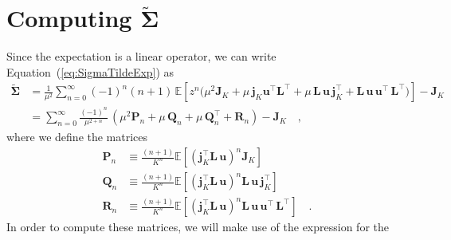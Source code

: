 \documentclass[modern]{aastex62}
\begin{document}
    \section{Computing $\tilde{\pmb{\Sigma}}$}
    Since the expectation is a linear operator, we can write Equation~(\ref{eq:SigmaTildeExp})
    as
    \begin{align}
        \tilde{\pmb{\Sigma}}
         & =
        \frac{1}{\mu^2}
        \sum\limits_{n=0}^\infty
        (-1)^n (n + 1)
        \,
        \mathbb{E}\left[
            z^n
            \Bigg(
            \mu^2 \mathbf{J}_K
            +
            \mu \, \mathbf{j}_K\mathbf{u}^\top \mathbf{L}^\top
            +
            \mu \, \mathbf{L} \, \mathbf{u} \, \mathbf{j}_K^\top
            +
            \mathbf{L} \, \mathbf{u} \, \mathbf{u}^\top \, \mathbf{L}^\top
            \Bigg)
            \right]
        - \mathbf{J}_K
        \nonumber \\[0.5em]
         & =
        \sum\limits_{n=0}^\infty
        \frac{(-1)^n}{\mu^{2 + n}}
        \,
        \left(
        \mu^2 \mathbf{P}_n
        +
        \mu \, \mathbf{Q}_n
        +
        \mu \, \mathbf{Q}_n^\top
        +
        \mathbf{R}_n
        \right)
        - \mathbf{J}_K
        \quad,
    \end{align}
    where we define the matrices
    \begin{align}
        \mathbf{P}_n & \equiv \frac{(n + 1)}{K^n}\mathbb{E}\left[ \left(\mathbf{j}_K^\top \mathbf{L} \, \mathbf{u}\right)^n \mathbf{J}_K \right]
        \nonumber                                                                                                                                                                                  \\[0.5em]
        \mathbf{Q}_n & \equiv \frac{(n + 1)}{K^n}\mathbb{E}\left[ \left(\mathbf{j}_K^\top \mathbf{L} \, \mathbf{u}\right)^n \mathbf{L} \, \mathbf{u} \, \mathbf{j}_K^\top \right]
        \nonumber                                                                                                                                                                                  \\[0.5em]
        \mathbf{R}_n & \equiv \frac{(n + 1)}{K^n}\mathbb{E}\left[ \left(\mathbf{j}_K^\top \mathbf{L} \, \mathbf{u}\right)^n \mathbf{L} \, \mathbf{u} \, \mathbf{u}^\top \, \mathbf{L}^\top \right]
        \quad.
    \end{align}
    In order to compute these matrices,
    we will make use of the expression for the
\end{document}
